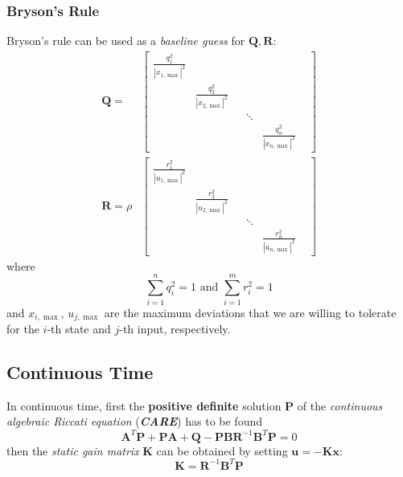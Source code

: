 \subsubsection{Bryson's Rule}
Bryson's rule can be used as a \textit{baseline guess} for $\mathbf{Q,R}$:
\noindent\begin{align*}
    \mathbf{Q} =
     & \begin{bmatrix}\frac{q_1^2}{|x_{1,\max}|^2} &                              &  &        &                              & \\
                                            & \frac{q_2^2}{|x_{2,\max}|^2} &  &        &                              & \\
                                            &                              &  & \ddots &                              & \\
                                            &                              &  &        & \frac{q_n^2}{|x_{n,\max}|^2}
       \end{bmatrix} \\
    \mathbf{R} = \rho
     & \begin{bmatrix}\frac{r_1^2}{|u_{1,\max}|^2} &                              &  &        &                              & \\
                                            & \frac{r_2^2}{|u_{2,\max}|^2} &  &        &                              & \\
                                            &                              &  & \ddots &                              & \\
                                            &                              &  &        & \frac{r_n^2}{|u_{n,\max}|^2}
       \end{bmatrix}
\end{align*}
where
\noindent\begin{equation*}
    \sum_{i=1}^n q_i^2=1\text{ and }\sum_{i=1}^m r_i^2=1
\end{equation*}
and $x_{i,\max}$, $u_{j,\max}$ are the maximum deviations that we are willing to tolerate for the $i$-th state and $j$-th input, respectively.

\subsection{Continuous Time}
In continuous time, first the \textbf{positive definite} solution $\mathbf{P}$ of the \textit{continuous algebraic Riccati equation} (\textbf{\textit{CARE}}) has to be found
\noindent\begin{equation*}
    \mathbf{A}^T \mathbf{P}+\mathbf{PA}+\mathbf{Q}-\mathbf{PBR}^{-1}\mathbf{B}^T \mathbf{P}=0
\end{equation*}
then the \textit{static gain matrix} $\mathbf{K}$ can be obtained by setting $\mathbf{u} = -\mathbf{Kx}$:
\noindent\begin{equation*}
    \mathbf{K}=\mathbf{R}^{-1}\mathbf{B}^T \mathbf{P}
\end{equation*}

